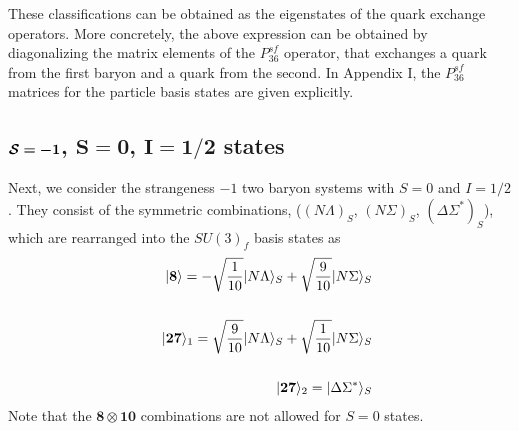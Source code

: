 \documentclass[aps,prd,showpacs,floatfix,reprint,nofootinbib]{revtex4-1}
\newcommand \cc[1]{{\bm {#1}}}
\begin{document}
These classifications can be obtained as the eigenstates of the quark exchange operators.
More concretely, the above expression can be obtained by diagonalizing the matrix elements of the $P_{36}^{sf}$ operator, that
exchanges a quark from the first baryon and a quark from the second. In Appendix I, the $P_{36}^{sf}$ matrices 
for the particle basis states are given explicitly.

\subsection{$\bm{{\cal S}=-1}$, $\bm{S=0}$, $\bm{I=1/2}$ states}\label{S-1,S=0}

Next, we consider the strangeness $-1$ two baryon systems with $S=0$ and $I=1/2$.
They consist of the symmetric combinations, ($(N\Lambda)_S$, $(N\Sigma)_S$, $(\Delta\Sigma^*)_S$),
which are rearranged into the $SU(3)_f$ basis states %
as
\begin{eqnarray}
&& |{\bf 8}\rangle = -\sqrt{\frac{1}{10}} |N\Lambda\rangle_S +  \sqrt{\frac{9}{10}} |N\Sigma\rangle_S
\\
\nonumber\\
&&  |{\bf 27}\rangle_1 = \sqrt{\frac{9}{10}} |N\Lambda\rangle_S +  \sqrt{\frac{1}{10}} |N\Sigma\rangle_S
\\
\nonumber\\
&& |{\bf 27}\rangle_2 =  |\Delta\Sigma^*\rangle_S
\end{eqnarray}
Note that the $\cc8\otimes\cc{10}$ combinations are not allowed for $S=0$ states.
\end{document}
